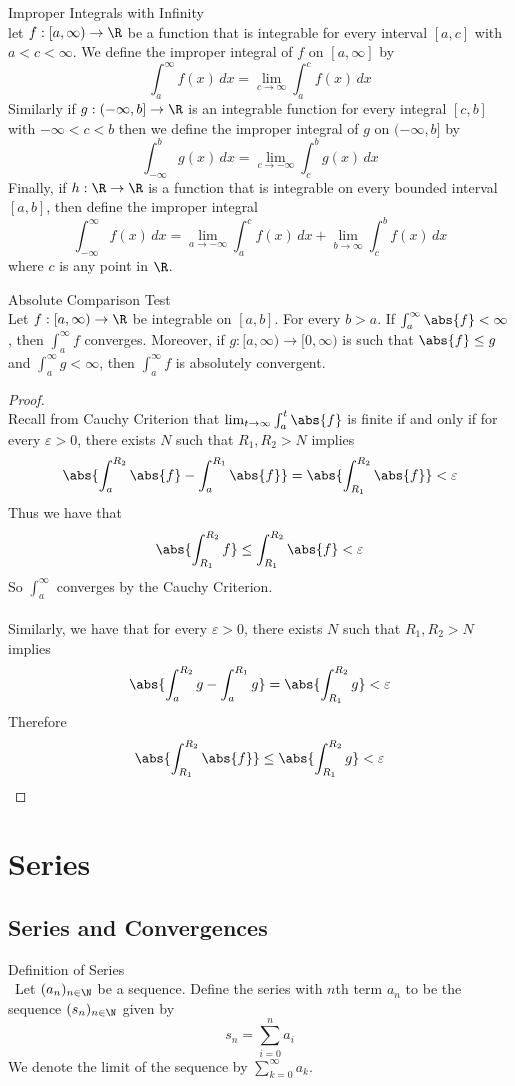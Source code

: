 \documentclass[a4paper]{article}
\begin{document}
\begin{defn}{Improper Integrals with Infinity}{}\\ let $f:[a,\infty)\to\R$ be a function that is integrable for every interval $[a,c]$ with $a<c<\infty$. We define the improper integral of $f$ on $[a,\infty]$ by $$\int_{a}^{\infty}f(x)\,dx=\lim_{c\to\infty}\int_{a}^{c}f(x)\,dx$$
Similarly if $g:(-\infty,b]\to\R$ is an integrable function for every integral $[c,b]$ with $-\infty<c<b$ then we define the improper integral of $g$ on $(-\infty,b]$ by $$\int_{-\infty}^{b}g(x)\,dx=\lim_{c\to-\infty}\int_{c}^{b}g(x)\,dx$$
Finally, if $h:\R\to\R$ is a function that is integrable on every bounded interval $[a,b]$, then define the improper integral $$\int_{-\infty}^\infty f(x)\,dx=\lim_{a\to-\infty}\int_a^cf(x)\,dx+\lim_{b\to\infty}\int_c^bf(x)\,dx$$ where $c$ is any point in $\R$. 
\end{defn}

\begin{thm}{Absolute Comparison Test}{}\\ Let $f:[a,\infty)\to\R$ be integrable on $[a,b]$. For every $b>a$. If $\int_a^\infty\abs{f}<\infty$, then $\int_a^\infty f$ converges. Moreover, if $g:[a,\infty)\to[0,\infty)$ is such that $\abs{f}\leq g$ and $\int_a^\infty g<\infty$, then $\int_a^\infty f$ is absolutely convergent. 
\begin{proof}\\ Recall from Cauchy Criterion that $\lim_{t\to\infty}\int_a^t\abs{f}$ is finite if and only if for every $\varepsilon>0$, there exists $N$ such that $R_1,R_2>N$ implies $$\abs{\int_a^{R_2}\abs{f}-\int_a^{R_1}\abs{f}}=\abs{\int_{R_1}^{R_2}\abs{f}}<\varepsilon$$ Thus we have that $$\abs{\int_{R_1}^{R_2}f}\leq\int_{R_1}^{R_2}\abs{f}<\varepsilon$$ So $\int_a^\infty$ converges by the Cauchy Criterion. \\~\\
Similarly, we have that for every $\varepsilon>0$, there exists $N$ such that $R_1,R_2>N$ implies $$\abs{\int_a^{R_2}g-\int_a^{R_1}g}=\abs{\int_{R_1}^{R_2}g}<\varepsilon$$ Therefore $$\abs{\int_{R_1}^{R_2}\abs{f}}\leq\abs{\int_{R_1}^{R_2}g}<\varepsilon$$
\end{proof}
\end{thm}

\pagebreak
\section{Series}
\subsection{Series and Convergences}
\begin{defn}{Definition of Series}{}\\\
Let $(a_n)_{n\in\N}$ be a sequence. Define the series with $n$th term $a_n$ to be the sequence $(s_n)_{n\in\N}$ given by $$s_n=\sum_{i=0}^na_i$$ We denote the limit of the sequence by $\sum_{k=0}^\infty a_k$. 
\end{defn}
\end{document}
